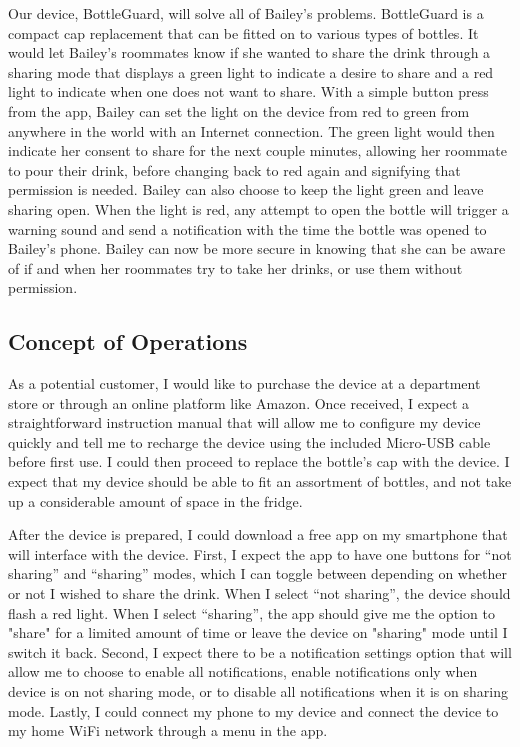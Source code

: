 \documentclass[12pt]{article}
\begin{document}
		Our device, BottleGuard, will solve all of Bailey’s problems. BottleGuard is a compact cap replacement that can be fitted on to various types of bottles. It would let Bailey’s roommates know if she wanted to share the drink through a sharing mode that displays a green light to indicate a desire to share and a red light to indicate when one does not want to share. With a simple button press from the app, Bailey can set the light on the device from red to green from anywhere in the world with an Internet connection. The green light would then indicate her consent to share for the next couple minutes, allowing her roommate to pour their drink, before changing back to red again and signifying that permission is needed.  Bailey can also choose to keep the light green and leave sharing open. When the light is red, any attempt to open the bottle will trigger a warning sound and send a notification with the time the bottle was opened to Bailey’s phone. Bailey can now be more secure in knowing that she can be aware of if and when her roommates try to take her drinks, or use them without permission.
		
		\subsection*{Concept of Operations}
		
		As a potential customer, I would like to purchase the device at a department store or through an online platform like Amazon. Once received, I expect a straightforward instruction manual that will allow me to configure my device quickly and tell me to recharge the device using the included Micro-USB cable before first use. I could then proceed to replace the bottle’s cap with the device. I expect that my device should be able to fit an assortment of bottles, and not take up a considerable amount of space in the fridge. 
		
		After the device is prepared, I could download a free app on my smartphone that will interface with the device. First, I expect the app to have one buttons for “not sharing” and “sharing” modes, which I can toggle between depending on whether or not I wished to share the drink. When I select “not sharing”, the device should flash a red light. When I select “sharing”, the app should give me the option to "share" for a limited amount of time or leave the device on "sharing" mode until I switch it back. Second, I expect there to be a notification settings option that will allow me to choose to enable all notifications, enable notifications only when device is on not sharing mode, or to disable all notifications when it is on sharing mode. Lastly, I could connect my phone to my device and connect the device to my home WiFi network through a menu in the app. 
		
\end{document}
